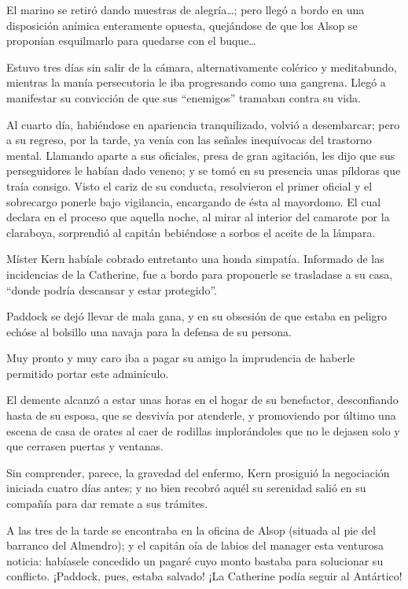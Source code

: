 \documentclass[10pt,twoside,openright]{memoir}
\begin{document}
El marino se retiró dando muestras de alegría\ldots; pero llegó a bordo en
una disposición anímica enteramente
opuesta, quejándose de que los Alsop se proponían esquilmarlo para
quedarse con el buque\ldots

Estuvo tres días sin salir de la cámara, alternativamente colérico y
meditabundo, mientras la manía persecutoria le iba progresando como una
gangrena. Llegó a manifestar su convicción de que sus ``enemigos''
tramaban contra su vida.

Al cuarto día, habiéndose en apariencia tranquilizado, volvió a
desembarcar; pero a su regreso, por la tarde, ya venía con las señales
inequívocas del trastorno mental. Llamando aparte a sus oficiales, presa
de gran agitación, les dijo que sus perseguidores le habían dado veneno;
y se tomó en su presencia unas píldoras que traía consigo. Visto el
cariz de su conducta, resolvieron el primer oficial y el sobrecargo
ponerle bajo vigilancia, encargando de ésta al mayordomo. El cual
declara en el proceso que aquella noche, al mirar al interior del
camarote por la claraboya, sorprendió al capitán bebiéndose a sorbos el
aceite de la lámpara.

Míster Kern habíale cobrado entretanto una honda simpatía. Informado de
las incidencias de la Catherine, fue a bordo para proponerle se
trasladase a su casa, ``donde podría descansar y estar protegido''.

Paddock se dejó llevar de mala gana, y en su obsesión de que estaba en
peligro echóse al bolsillo una navaja para la defensa de su persona.

Muy pronto y muy caro iba a pagar su amigo la imprudencia de haberle
permitido portar este adminículo.

El demente alcanzó a estar unas horas en el hogar de su benefactor,
desconfiando hasta de su esposa, que se desvivía por atenderle, y
promoviendo por último una escena de casa de orates al caer de rodillas
implorándoles que no le dejasen solo y que cerrasen puertas y ventanas.

Sin comprender, parece, la gravedad del enfermo, Kern prosiguió la
negociación iniciada cuatro días antes; y no bien recobró aquél su
serenidad salió en su compañía para dar remate a sus trámites.

A las tres de la tarde se encontraba en la oficina de Alsop (situada al
pie del barranco del Almendro); y el
capitán oía de labios del manager esta venturosa noticia: habíasele
concedido un pagaré cuyo monto bastaba para solucionar su conflicto.
¡Paddock, pues, estaba salvado! ¡La Catherine podía seguir al Antártico!
\end{document}
